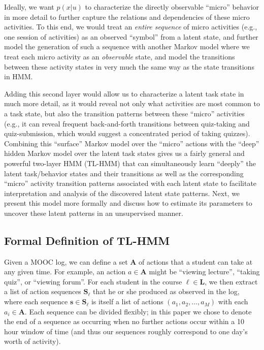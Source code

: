 Ideally, we want $p(x|u)$ to characterize the directly observable ``micro''
behavior in more detail to further capture the relations and dependencies
of these micro activities. To this end, we would treat an {\em entire
sequence} of micro activities (e.g., one session of activities) as an
observed ``symbol'' from a latent state, and further model the generation
of such a sequence with another Markov model where we treat each micro
activity as an {\em observable} state, and model the transitions between
these activity states in very much the same way as the state transitions in
HMM.

Adding this second layer would allow us to characterize a latent task
state in much more detail, as it would reveal not only what activities are
most common to a task state, but also the transition patterns between these
``micro'' activities (e.g., it can reveal frequent back-and-forth
transitions between quiz-taking and quiz-submission, which would suggest a
concentrated period of taking quizzes). Combining this ``surface'' Markov
model over the ``micro'' actions with the ``deep'' hidden Markov model over
the latent task states gives us a fairly general and powerful two-layer HMM
(TL-HMM) that can simultaneously learn ``deeply'' the latent task/behavior
states and their transitions as well as the corresponding ``micro''
activity transition patterns associated with each latent state to
facilitate interpretation and analysis of the discovered latent state
patterns. Next, we present this model more formally and discuss how to
estimate its parameters to uncover these latent patterns in an unsupervised
manner.

\subsection{Formal Definition of TL-HMM}

Given a MOOC log, we can define a set $\mathbf{A}$ of actions that a
student can take at any given time. For example, an action $a \in
\mathbf{A}$ might be ``viewing lecture'', ``taking quiz'', or ``viewing
forum''. For each student in the course $\ell \in \mathbf{L}$, we then
extract a list of action sequences $\mathbf{S}_\ell$ that he or she
produced as observed in the log, where each sequence $\mathbf{s} \in
\mathbf{S}_\ell$ is itself a list of actions $(a_1, a_2, \ldots, a_M)$ with
each $a_i \in \mathbf{A}$.  Each sequence can be divided flexibly; in this
paper we chose to denote the end of a sequence as occurring when no further
actions occur within a 10 hour window of time (and thus our sequences
roughly correspond to one day's worth of activity).

